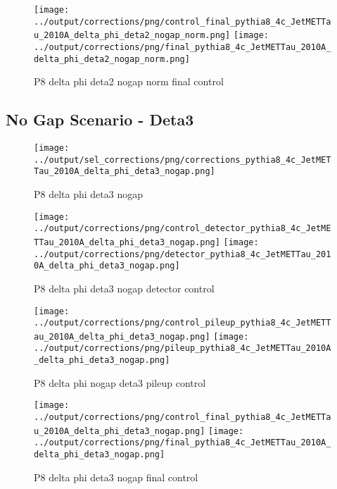 \documentclass[11pt]{book}
\begin{document}
\begin{figure}[ht]
\centering
\texttt{[image: ../output/corrections/png/control\_final\_pythia8\_4c\_JetMETTau\_2010A\_delta\_phi\_deta2\_nogap\_norm.png]}
\texttt{[image: ../output/corrections/png/final\_pythia8\_4c\_JetMETTau\_2010A\_delta\_phi\_deta2\_nogap\_norm.png]}
\caption{P8 delta phi deta2 nogap norm final control}
\label{fig:p8_JetMETTau_2010A_delta_phi_deta2_nogap_norm_final_control}
\end{figure}


\clearpage
\subsection{No Gap Scenario - Deta3}
\begin{figure}[ht]
\centering
\texttt{[image: ../output/sel\_corrections/png/corrections\_pythia8\_4c\_JetMETTau\_2010A\_delta\_phi\_deta3\_nogap.png]}
\caption{P8 delta phi deta3 nogap}
\label{fig:p8_JetMETTau_2010A_delta_phi_deta3_nogap}
\end{figure}

\begin{figure}[ht]
\centering
\texttt{[image: ../output/corrections/png/control\_detector\_pythia8\_4c\_JetMETTau\_2010A\_delta\_phi\_deta3\_nogap.png]}
\texttt{[image: ../output/corrections/png/detector\_pythia8\_4c\_JetMETTau\_2010A\_delta\_phi\_deta3\_nogap.png]}
\caption{P8 delta phi deta3 nogap detector control}
\label{fig:p8_JetMETTau_2010A_delta_phi_deta3_nogap_detector_control}
\end{figure}

\begin{figure}[ht]
\centering
\texttt{[image: ../output/corrections/png/control\_pileup\_pythia8\_4c\_JetMETTau\_2010A\_delta\_phi\_deta3\_nogap.png]}
\texttt{[image: ../output/corrections/png/pileup\_pythia8\_4c\_JetMETTau\_2010A\_delta\_phi\_deta3\_nogap.png]}
\caption{P8 delta phi nogap deta3 pileup control}
\label{fig:p8_JetMETTau_2010A_delta_phi_deta3_nogap_pileup_control}
\end{figure}


\begin{figure}[ht]
\centering
\texttt{[image: ../output/corrections/png/control\_final\_pythia8\_4c\_JetMETTau\_2010A\_delta\_phi\_deta3\_nogap.png]}
\texttt{[image: ../output/corrections/png/final\_pythia8\_4c\_JetMETTau\_2010A\_delta\_phi\_deta3\_nogap.png]}
\caption{P8 delta phi deta3 nogap final control}
\label{fig:p8_JetMETTau_2010A_delta_phi_deta3_nogap_final_control}
\end{figure}
\end{document}
